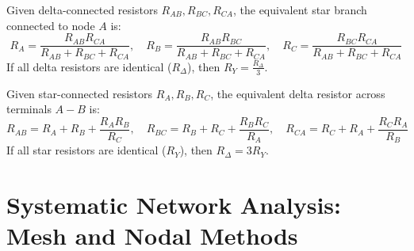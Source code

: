 \begin{theorem}
Given delta-connected resistors $R_{AB}, R_{BC}, R_{CA}$, the equivalent star branch connected to node $A$ is:
\begin{equation}
R_A = \frac{R_{AB} R_{CA}}{R_{AB} + R_{BC} + R_{CA}}, \quad R_B = \frac{R_{AB} R_{BC}}{R_{AB} + R_{BC} + R_{CA}}, \quad R_C = \frac{R_{BC} R_{CA}}{R_{AB} + R_{BC} + R_{CA}}
\end{equation}
If all delta resistors are identical ($R_\Delta$), then $R_Y = \frac{R_\Delta}{3}$.
\end{theorem}

\begin{theorem}
Given star-connected resistors $R_A, R_B, R_C$, the equivalent delta resistor across terminals $A-B$ is:
\begin{equation}
R_{AB} = R_A + R_B + \frac{R_A R_B}{R_C}, \quad R_{BC} = R_B + R_C + \frac{R_B R_C}{R_A}, \quad R_{CA} = R_C + R_A + \frac{R_C R_A}{R_B}
\end{equation}
If all star resistors are identical ($R_Y$), then $R_\Delta = 3 R_Y$.
\end{theorem}

\section{Systematic Network Analysis: Mesh and Nodal Methods}

